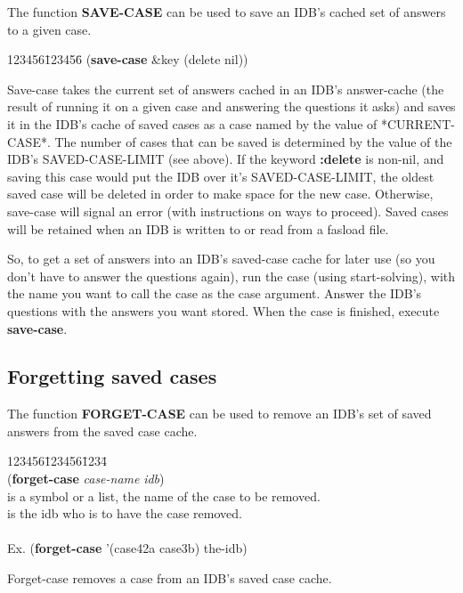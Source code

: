 The function {\bf SAVE-CASE} can be used to save an IDB's cached set
of answers to a given case.

\begin{tabbing}
123456\=123456\= \kill
({\bf save-case} \&key (delete nil)) \\
\end{tabbing}
Save-case takes the current set of answers cached in an IDB's
answer-cache (the result of running it on a given case and answering
the questions it asks) and saves it in the IDB's cache of saved cases
as a case named by the value of *CURRENT-CASE*. The number of cases
that can be saved is determined by the value of the IDB's
SAVED-CASE-LIMIT (see above). If the keyword {\bf :delete} is non-nil,
and saving this case would put the IDB over it's SAVED-CASE-LIMIT, the
oldest saved case will be deleted in order to make space for the new
case. Otherwise, save-case will signal an error (with instructions on
ways to proceed). Saved cases will be retained when an IDB is written
to or read from a fasload file.

So, to get a set of answers into an IDB's saved-case cache for later
use (so you don't have to answer the questions again), run the case
(using start-solving), with the name you want to call the case as the
case argument. Answer the IDB's questions with the answers you want
stored. When the case is finished, execute {\bf save-case}. 

\subsection{Forgetting saved cases}

The function {\bf FORGET-CASE} can be used to remove an IDB's set of
saved answers from the saved case cache.

\begin{tabbing}
123456\=123456\=1234\= \kill
\\
({\bf forget-case} {\it case-name} {\it idb}) \\
\> is a symbol or a list, the name of the case to be
removed. \\
\> is the idb who is to have the case removed. \\
\\
\>Ex.  ({\bf forget-case} '(case42a case3b) the-idb) \\
\end{tabbing}
Forget-case removes a case from an IDB's saved case cache.

